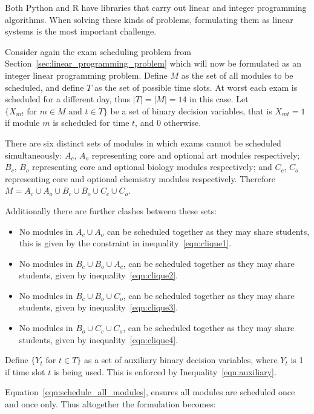 Both Python and R have libraries that carry out linear and integer
programming algorithms. When solving these kinds of problems, formulating
them as linear systems is the most important challenge.

Consider again the exam scheduling problem from
Section~\ref{sec:linear_programming_problem} which
will now be formulated as an integer linear programming problem.
Define \(M\) as the set of all modules to be scheduled, and define \(T\) as the set
of possible time slots. At worst each exam is
scheduled for a different day, thus \(|T| = |M| = 14\) in this case.
Let \(\{X_{mt} \text{ for } m \in M \text{ and } t \in T\}\) be a set of binary
decision variables, that is \(X_{mt} = 1\) if module \(m\) is scheduled for time
\(t\), and \(0\) otherwise.

There are six distinct sets of modules in which exams cannot be scheduled
simultaneously: \(A_c\), \(A_o\) representing core and optional art modules
respectively; \(B_c\), \(B_o\) representing core and optional biology modules
respectively; and \(C_c\), \(C_o\) representing core and optional chemistry modules
respectively.
Therefore \(M = A_c \cup A_o \cup B_c \cup B_o \cup C_c \cup C_o\).

Additionally there are further clashes between these sets:
\begin{itemize}
  \item No modules in \(A_c \cup A_o\) can be scheduled together as they may
  share students, this is given by the constraint in inequality~\ref{eqn:clique1}.
  \item No modules in \(B_c \cup B_o \cup A_c\), can be scheduled together as
  they may share students, given by inequality~\ref{eqn:clique2}.
  \item No modules in \(B_c \cup B_o \cup C_o\), can be scheduled together as
  they may share students, given by inequality~\ref{eqn:clique3}.
  \item No modules in \(B_o \cup C_c \cup C_o\), can be scheduled together as
  they may share students, given by inequality~\ref{eqn:clique4}.
\end{itemize}

Define \(\{Y_t \text{ for } t \in T\}\) as a set of auxiliary binary
decision variables, where \(Y_t\) is 1 if time slot \(t\) is being used. This is
enforced by Inequality~\ref{eqn:auxiliary}.

Equation~\ref{eqn:schedule_all_modules},
ensures all modules are scheduled once and once only.
Thus altogether the formulation becomes:

